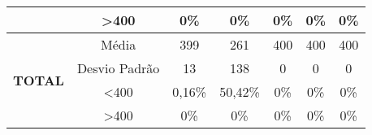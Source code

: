 \begin{table}[]
\begin{tabular}{|c|c|ccccc|}
                                & \textgreater 400 & 0\%            & 0\%            & 0\%            & 0\%            & 0\%            \\ \hline
\multirow{4}{*}{\textbf{TOTAL}} & Média            & 399               & 261               & 400               & 400               & 400               \\
                                & Desvio Padrão    & 13                & 138               & 0                 & 0                 & 0                 \\
                                & \textless 400    & 0,16\%            & 50,42\%           & 0\%            & 0\%            & 0\%            \\
                                & \textgreater 400 & 0\%            & 0\%            & 0\%            & 0\%            & 0\%            \\ \hline
\end{tabular}
\end{table}
